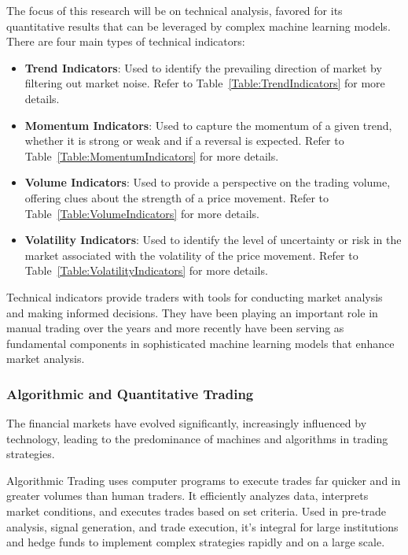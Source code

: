 The focus of this research will be on technical analysis, favored for its quantitative results that can be leveraged by complex machine learning models. There are four main types of technical indicators:

\begin{itemize}
\item \textbf{Trend Indicators}: Used to identify the prevailing direction of market by filtering out market noise. Refer to Table~\ref{Table:TrendIndicators} for more details.
\item \textbf{Momentum Indicators}: Used to capture the momentum of a given trend, whether it is strong or weak and if a reversal is expected. Refer to Table~\ref{Table:MomentumIndicators} for more details.
\item \textbf{Volume Indicators}: Used to provide a perspective on the trading volume, offering clues about the strength of a price movement. Refer to Table~\ref{Table:VolumeIndicators} for more details.
\item \textbf{Volatility Indicators}: Used to identify the level of uncertainty or risk in the market associated with the volatility of the price movement. Refer to Table~\ref{Table:VolatilityIndicators} for more details.
\end{itemize}






Technical indicators provide traders with tools for conducting market analysis and making informed decisions. They have been playing an important role in manual trading over the years and more recently have been serving as fundamental components in sophisticated machine learning models that enhance market analysis.

\subsubsection{Algorithmic and Quantitative Trading}

The financial markets have evolved significantly, increasingly influenced by technology, leading to the predominance of machines and algorithms in trading strategies. 

Algorithmic Trading uses computer programs to execute trades far quicker and in greater volumes than human traders. It efficiently analyzes data, interprets market conditions, and executes trades based on set criteria. Used in pre-trade analysis, signal generation, and trade execution, it's integral for large institutions and hedge funds to implement complex strategies rapidly and on a large scale.


